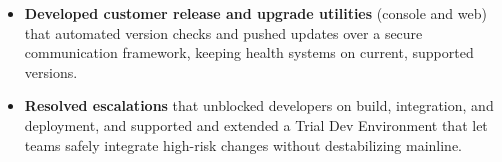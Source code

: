 \documentclass{resume}
\begin{document}
\begin{itemize}
  \item \textbf{Developed customer release and upgrade utilities} (console and web) that automated version checks and pushed updates over a secure communication framework, keeping health systems on current, supported versions.
  \item \textbf{Resolved escalations} that unblocked developers on build, integration, and deployment, and supported and extended a Trial Dev Environment that let teams safely integrate high-risk changes without destabilizing mainline.
\end{itemize}
\end{document}
